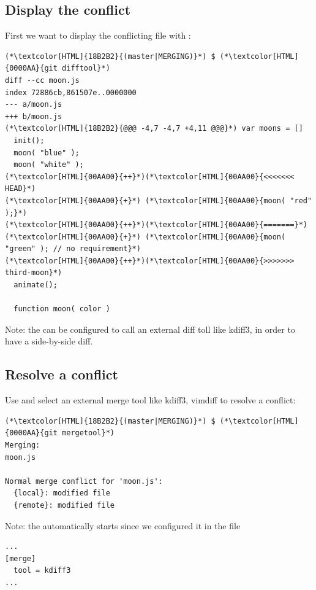 \subsection{Display the conflict}
\begin{frame}[fragile]
  \subslidetitle

  First we want to display the conflicting file with :
  \begin{lstlisting}
(*\textcolor[HTML]{18B2B2}{(master|MERGING)}*) $ (*\textcolor[HTML]{0000AA}{git difftool}*)
diff --cc moon.js
index 72886cb,861507e..0000000
--- a/moon.js
+++ b/moon.js
(*\textcolor[HTML]{18B2B2}{@@@ -4,7 -4,7 +4,11 @@@}*) var moons = []
  init();
  moon( "blue" );
  moon( "white" );
(*\textcolor[HTML]{00AA00}{++}*)(*\textcolor[HTML]{00AA00}{<<<<<<< HEAD}*)
(*\textcolor[HTML]{00AA00}{+}*) (*\textcolor[HTML]{00AA00}{moon( "red" );}*)
(*\textcolor[HTML]{00AA00}{++}*)(*\textcolor[HTML]{00AA00}{=======}*)
(*\textcolor[HTML]{00AA00}{+}*) (*\textcolor[HTML]{00AA00}{moon( "green" ); // no requirement}*)
(*\textcolor[HTML]{00AA00}{++}*)(*\textcolor[HTML]{00AA00}{>>>>>>> third-moon}*)
  animate();

  function moon( color )
\end{lstlisting}
  Note: the  can be configured to call an external diff toll like kdiff3, in order to have a side-by-side diff.
\end{frame}

\subsection{Resolve a conflict}
\begin{frame}[fragile]
  \subslidetitle
  Use  and select an external merge tool like kdiff3, vimdiff to resolve a conflict:

  \begin{lstlisting}
(*\textcolor[HTML]{18B2B2}{(master|MERGING)}*) $ (*\textcolor[HTML]{0000AA}{git mergetool}*)
Merging:
moon.js

Normal merge conflict for 'moon.js':
  {local}: modified file
  {remote}: modified file
\end{lstlisting}

  Note: the  automatically starts since we configured it in the  file
  \begin{lstlisting}
...
[merge]
  tool = kdiff3
...
\end{lstlisting}
\end{frame}

